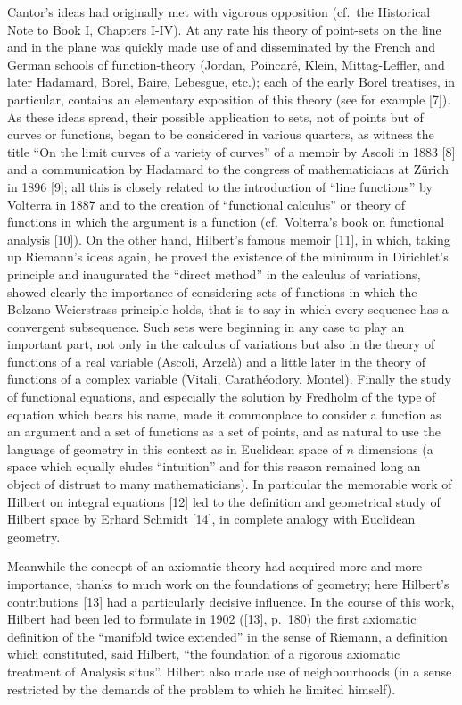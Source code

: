 Cantor's ideas had originally met with vigorous opposition (cf.~the Historical Note to Book I, Chapters I-IV). At any rate his theory of point-sets on the line and in the plane was quickly made use of and disseminated by the French and German schools of function-theory (Jordan, Poincaré, Klein, Mittag-Leffler, and later Hadamard, Borel, Baire, Lebesgue, etc.); each of the early Borel treatises, in particular, contains an elementary exposition of this theory (see for example {[}7{]}). As these ideas spread, their possible application to sets, not of points but of curves or functions, began to be considered in various quarters, as witness the title ``On the limit curves of a variety of curves'' of a memoir by Ascoli in 1883 {[}8{]} and a communication by Hadamard to the congress of mathematicians at Zürich in 1896 {[}9{]}; all this is closely related to the introduction of ``line functions'' by Volterra in 1887 and to the creation of ``functional calculus'' or theory of functions in which the argument is a function (cf.~Volterra's book on functional analysis {[}10{]}). On the other hand, Hilbert's famous memoir {[}11{]}, in which, taking up Riemann's ideas again, he proved the existence of the minimum in Dirichlet's principle and inaugurated the ``direct method'' in the calculus of variations, showed clearly the importance of considering sets of functions in which the Bolzano-Weierstrass principle holds, that is to say in which every sequence has a convergent subsequence. Such sets were beginning in any case to play an important part, not only in the calculus of variations but also in the theory of functions of a real variable (Ascoli, Arzelà) and a little later in the theory of functions of a complex variable (Vitali, Carathéodory, Montel). Finally the study of functional equations, and especially the solution by Fredholm of the type of equation which bears his name, made it commonplace to consider a function as an argument and a set of functions as a set of points, and as natural to use the language of geometry in this context as in Euclidean space of \(n\) dimensions (a space which equally eludes ``intuition'' and for this reason remained long an object of distrust to many mathematicians). In particular the memorable work of Hilbert on integral equations {[}12{]} led to the definition and geometrical study of Hilbert space by Erhard Schmidt {[}14{]}, in complete analogy with Euclidean geometry.

Meanwhile the concept of an axiomatic theory had acquired more and more importance, thanks to much work on the foundations of geometry; here Hilbert's contributions {[}13{]} had a particularly decisive influence. In the course of this work, Hilbert had been led to formulate in 1902 ({[}13{]}, p.~180) the first axiomatic definition of the ``manifold twice extended'' in the sense of Riemann, a definition which constituted, said Hilbert, ``the foundation of a rigorous axiomatic treatment of Analysis situs''. Hilbert also made use of neighbourhoods (in a sense restricted by the demands of the problem to which he limited himself).


